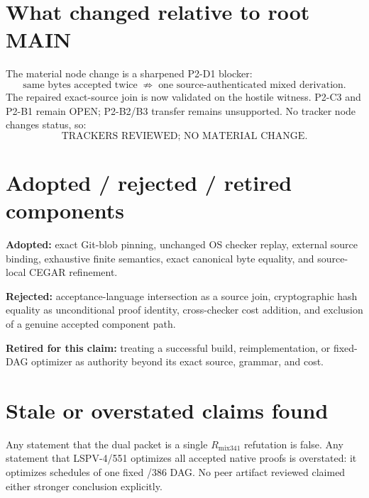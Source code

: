 \documentclass[11pt]{article}
\begin{document}
\section*{What changed relative to root MAIN}
The material node change is a sharpened P2-D1 blocker:
\[
 \text{same bytes accepted twice}\;\not\Rightarrow\;
 \text{one source-authenticated mixed derivation}.
\]
The repaired exact-source join is now validated on the hostile witness.
P2-C3 and P2-B1 remain OPEN; P2-B2/B3 transfer remains unsupported.
No tracker node changes status, so:
\[
\boxed{\text{TRACKERS REVIEWED; NO MATERIAL CHANGE.}}
\]

\section*{Adopted / rejected / retired components}
\textbf{Adopted:} exact Git-blob pinning, unchanged OS checker replay,
external source binding, exhaustive finite semantics, exact canonical byte
equality, and source-local CEGAR refinement.

\textbf{Rejected:} acceptance-language intersection as a source join,
cryptographic hash equality as unconditional proof identity, cross-checker
cost addition, and exclusion of a genuine accepted component path.

\textbf{Retired for this claim:} treating a successful build,
reimplementation, or fixed-DAG optimizer as authority beyond its exact
source, grammar, and cost.

\section*{Stale or overstated claims found}
Any statement that the dual packet is a single \(R_{\mathrm{mix341}}\)
refutation is false. Any statement that LSPV-4/551 optimizes all accepted
native proofs is overstated: it optimizes schedules of one fixed /386 DAG.
No peer artifact reviewed claimed either stronger conclusion explicitly.
\end{document}
